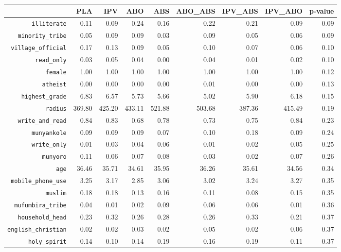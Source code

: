 \begin{longtable}{rrrrrrrrr}
  \hline
 & PLA & IPV & ABO & ABS & ABO\_ABS & IPV\_ABS & IPV\_ABO & p-value \\ 
  \hline
{\texttt{illiterate}} & 0.11 & 0.09 & 0.24 & 0.16 & 0.22 & 0.21 & 0.09 & 0.09 \\ 
  {\texttt{minority\_tribe}} & 0.05 & 0.09 & 0.09 & 0.03 & 0.09 & 0.05 & 0.06 & 0.09 \\ 
  {\texttt{village\_official}} & 0.17 & 0.13 & 0.09 & 0.05 & 0.10 & 0.07 & 0.06 & 0.10 \\ 
  {\texttt{read\_only}} & 0.03 & 0.05 & 0.04 & 0.00 & 0.04 & 0.01 & 0.02 & 0.10 \\ 
  {\texttt{female}} & 1.00 & 1.00 & 1.00 & 1.00 & 1.00 & 1.00 & 1.00 & 0.12 \\ 
  {\texttt{atheist}} & 0.00 & 0.00 & 0.00 & 0.00 & 0.01 & 0.00 & 0.00 & 0.13 \\ 
  {\texttt{highest\_grade}} & 6.83 & 6.57 & 5.73 & 5.66 & 5.02 & 5.90 & 6.18 & 0.15 \\ 
  {\texttt{radius}} & 369.80 & 425.20 & 433.11 & 521.88 & 503.68 & 387.36 & 415.49 & 0.19 \\ 
  {\texttt{write\_and\_read}} & 0.84 & 0.83 & 0.68 & 0.78 & 0.73 & 0.75 & 0.84 & 0.23 \\ 
  {\texttt{munyankole}} & 0.09 & 0.09 & 0.09 & 0.07 & 0.10 & 0.18 & 0.09 & 0.24 \\ 
  {\texttt{write\_only}} & 0.01 & 0.03 & 0.04 & 0.06 & 0.01 & 0.02 & 0.05 & 0.25 \\ 
  {\texttt{munyoro}} & 0.11 & 0.06 & 0.07 & 0.08 & 0.03 & 0.02 & 0.07 & 0.26 \\ 
  {\texttt{age}} & 36.46 & 35.71 & 34.61 & 35.95 & 36.26 & 35.61 & 34.56 & 0.34 \\ 
  {\texttt{mobile\_phone\_use}} & 3.25 & 3.17 & 2.85 & 3.06 & 3.02 & 3.24 & 3.27 & 0.35 \\ 
  {\texttt{muslim}} & 0.18 & 0.18 & 0.13 & 0.16 & 0.11 & 0.08 & 0.15 & 0.35 \\ 
  {\texttt{mufumbira\_tribe}} & 0.04 & 0.01 & 0.02 & 0.09 & 0.06 & 0.06 & 0.01 & 0.36 \\ 
  {\texttt{household\_head}} & 0.23 & 0.32 & 0.26 & 0.28 & 0.26 & 0.33 & 0.21 & 0.37 \\ 
  {\texttt{english\_christian}} & 0.02 & 0.02 & 0.03 & 0.02 & 0.05 & 0.02 & 0.06 & 0.37 \\ 
  {\texttt{holy\_spirit}} & 0.14 & 0.10 & 0.14 & 0.19 & 0.16 & 0.19 & 0.11 & 0.37 \\ 

\end{longtable}
